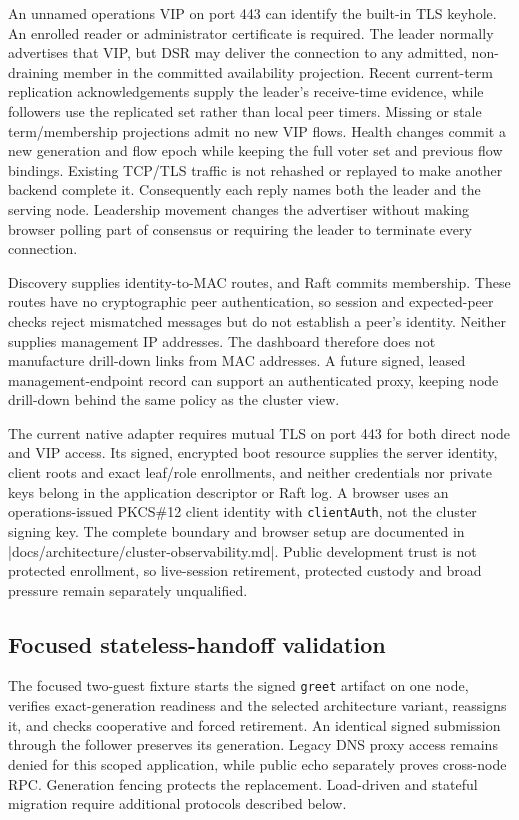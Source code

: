 An unnamed operations VIP on port 443 can identify the built-in TLS keyhole.
An enrolled reader or administrator certificate is required. The
leader normally advertises that VIP, but DSR may deliver the connection to any
admitted, non-draining member in the committed availability projection. Recent
current-term replication acknowledgements supply the leader's receive-time
evidence, while followers use the replicated set rather than local peer timers.
Missing or stale term/membership projections admit no new VIP flows. Health
changes commit a new generation and flow epoch while keeping the full voter
set and previous flow bindings. Existing TCP/TLS traffic is not rehashed or
replayed to make another backend complete it. Consequently each reply names both the leader
and the serving node. Leadership movement changes the advertiser without
making browser polling part of consensus or requiring the leader to terminate
every connection.

Discovery supplies identity-to-MAC routes, and Raft commits membership. These
routes have no cryptographic peer authentication, so session and expected-peer
checks reject mismatched messages but do not establish a peer's identity.
Neither supplies management IP addresses. The dashboard therefore does
not manufacture drill-down links from MAC addresses. A future signed, leased
management-endpoint record can support an authenticated
 proxy, keeping node drill-down
behind the same policy as the cluster view.

The current native adapter requires mutual TLS on port 443 for both direct
node and VIP access. Its signed, encrypted boot resource supplies the server
identity, client roots and exact leaf/role enrollments, and neither credentials nor
private keys belong in the application descriptor or Raft log. A browser
uses an operations-issued PKCS\#12 client identity with \texttt{clientAuth},
not the cluster signing key. The complete boundary and browser setup are
documented in \repofile|docs/architecture/cluster-observability.md|. Public
development trust is not protected enrollment, so live-session retirement,
protected custody and broad pressure remain separately unqualified.

\subsection{Focused stateless-handoff validation}

The focused two-guest fixture starts the signed \texttt{greet} artifact on one
node, verifies exact-generation readiness and the selected architecture variant,
reassigns it, and checks cooperative and forced retirement. An identical signed
submission through the follower preserves its generation. Legacy DNS proxy
access remains denied for this scoped application, while public echo separately proves
cross-node RPC. Generation fencing protects the replacement. Load-driven and
stateful migration require additional protocols described below.

